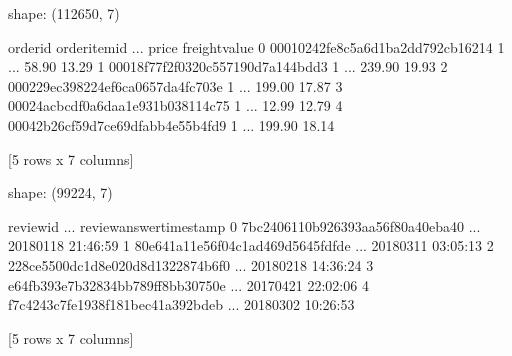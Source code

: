\documentclass[letterpaper,10pt,english]{jupyterBook}
\begin{document}
\begin{sphinxVerbatim}[commandchars=\\\{\}]
shape: (112650, 7)
\end{sphinxVerbatim}

\begin{sphinxVerbatim}[commandchars=\\\{\}]
                           order\PYGZus{}id  order\PYGZus{}item\PYGZus{}id  ...   price freight\PYGZus{}value
0  00010242fe8c5a6d1ba2dd792cb16214              1  ...   58.90         13.29
1  00018f77f2f0320c557190d7a144bdd3              1  ...  239.90         19.93
2  000229ec398224ef6ca0657da4fc703e              1  ...  199.00         17.87
3  00024acbcdf0a6daa1e931b038114c75              1  ...   12.99         12.79
4  00042b26cf59d7ce69dfabb4e55b4fd9              1  ...  199.90         18.14

[5 rows x 7 columns]
\end{sphinxVerbatim}

\begin{sphinxVerbatim}[commandchars=\\\{\}]
  
  
\end{sphinxVerbatim}

\begin{sphinxVerbatim}[commandchars=\\\{\}]
shape: (99224, 7)
\end{sphinxVerbatim}

\begin{sphinxVerbatim}[commandchars=\\\{\}]
                          review\PYGZus{}id  ... review\PYGZus{}answer\PYGZus{}timestamp
0  7bc2406110b926393aa56f80a40eba40  ...     2018\PYGZhy{}01\PYGZhy{}18 21:46:59
1  80e641a11e56f04c1ad469d5645fdfde  ...     2018\PYGZhy{}03\PYGZhy{}11 03:05:13
2  228ce5500dc1d8e020d8d1322874b6f0  ...     2018\PYGZhy{}02\PYGZhy{}18 14:36:24
3  e64fb393e7b32834bb789ff8bb30750e  ...     2017\PYGZhy{}04\PYGZhy{}21 22:02:06
4  f7c4243c7fe1938f181bec41a392bdeb  ...     2018\PYGZhy{}03\PYGZhy{}02 10:26:53

[5 rows x 7 columns]
\end{sphinxVerbatim}
\end{document}

